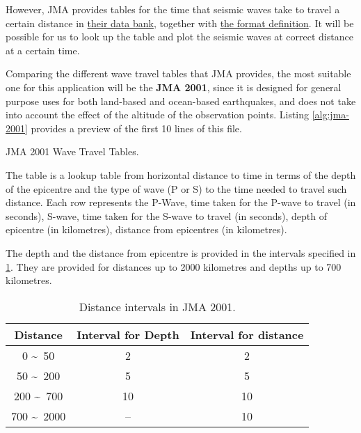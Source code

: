However, JMA provides tables for the time that seismic waves take to travel a certain distance in \href{https://www.data.jma.go.jp/svd/eqev/data/bulletin/catalog/appendix/trtime/trt_j.html}{their data bank}, together with \href{https://www.data.jma.go.jp/svd/eqev/data/bulletin/catalog/appendix/trtime/trt_j.html}{the format definition}. It will be possible for us to look up the table and plot the seismic waves at correct distance at a certain time.

Comparing the different wave travel tables that JMA provides, the most suitable one for this application will be the \textbf{JMA 2001}, since it is designed for general purpose uses for both land-based and ocean-based earthquakes, and does not take into account the effect of the altitude of the observation points. Listing \ref{alg:jma-2001} provides a preview of the first 10 lines of this file.

\begin{listing}[!ht]
    \caption{JMA 2001 Wave Travel Tables.}
    \label{alg:jma-2001}
\end{listing}

The table is a lookup table from horizontal distance to time in terms of the depth of the epicentre and the type of wave (P or S) to the time needed to travel such distance. Each row represents the P-Wave, time taken for the P-wave to travel (in seconds), S-wave, time taken for the S-wave to travel (in seconds), depth of epicentre (in kilometres), distance from epicentres (in kilometres).

The depth and the distance from epicentre is provided in the intervals specified in \ref{tab:dist-jma-2001}. They are provided for distances up to 2000 kilometres and depths up to 700 kilometres.

\begin{table}[!ht]
    \centering

    \begin{tabular}{|c|c|c|}
        \hline
        Distance                  & Interval for Depth & Interval for distance \\
        \hline
        0 \textasciitilde\ 50     & 2                  & 2                     \\
        50 \textasciitilde\ 200   & 5                  & 5                     \\
        200 \textasciitilde\ 700  & 10                 & 10                    \\
        700 \textasciitilde\ 2000 & --                 & 10                    \\
        \hline
    \end{tabular}
    \caption{Distance intervals in JMA 2001.}
    \label{tab:dist-jma-2001}
\end{table}

